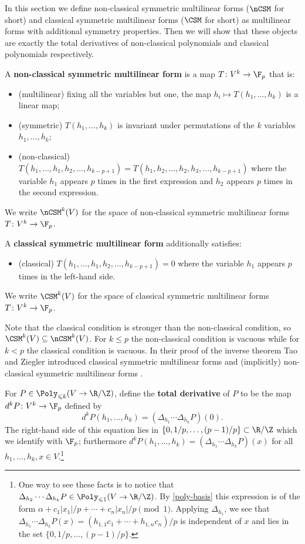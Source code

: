 In this section we define non-classical symmetric multilinear forms ($\nCSM$ for short) and classical symmetric multilinear forms ($\CSM$ for short) as multilinear forms with additional symmetry properties. Then we will show that these objects are exactly the total derivatives of non-classical polynomials and classical polynomials respectively.

\begin{defn}
A \textbf{non-classical symmetric multilinear form} is a map $T\colon V^k\to\F_p$ that is:
\begin{itemize}
    \item (multilinear) fixing all the variables but one, the map $h_i\mapsto T(h_1,\ldots,h_k)$ is a linear map;
    \item (symmetric) $T(h_1,\ldots,h_k)$ is invariant under permutations of the $k$ variables $h_1,\ldots, h_k$;
    \item (non-classical) $T(h_1,\ldots, h_1,h_2,\ldots, h_{k-p+1})=T(h_1,h_2,\ldots,h_2,h_3,\ldots, h_{k-p+1})$ where the variable $h_1$ appears $p$ times in the first expression and $h_2$ appears $p$ times in the second expression.
\end{itemize}
We write $\nCSM^k(V)$ for the space of non-classical symmetric multilinear forms $T\colon V^k\to \F_p$.

A \textbf{classical symmetric multilinear form} additionally satisfies:
\begin{itemize}
    \item (classical) $T(h_1,\ldots, h_1,h_2,\ldots, h_{k-p+1})=0$ where the variable $h_1$ appears $p$ times in the left-hand side.
\end{itemize}
We write $\CSM^k(V)$ for the space of classical symmetric multilinear forms $T\colon V^k\to \F_p$.
\end{defn}

Note that the classical condition is stronger than the non-classical condition, so $\CSM^k(V)\subseteq\nCSM^k(V)$. For $k\leq p$ the non-classical condition is vacuous while for $k<p$ the classical condition is vacuous. In their proof of the inverse theorem Tao and Ziegler introduced classical symmetric multilinear forms and (implicitly) non-classical symmetric multilinear forms \cite{TZ12}.

\begin{defn}
For $P\in\Poly_{\leqslant k}(V\to\R/\Z)$, define the \textbf{total derivative} of $P$ to be the map $d^kP\colon V^k\to\F_p$ defined by \[d^kP(h_1,\ldots, h_k)=(\Delta_{h_1}\cdots \Delta_{h_k}P)(0).\] The right-hand side of this equation lies in $\{0,1/p,\ldots,(p-1)/p\}\subset\R/\Z$ which we identify with $\F_p$; furthermore $d^kP(h_1,\ldots, h_k)=(\Delta_{h_1}\cdots \Delta_{h_k}P)(x)$ for all $h_1,\ldots, h_k,x\in V$.\footnote{One way to see these facts is to notice that $\Delta_{h_2}\cdots\Delta_{h_k}P\in\Poly_{\leqslant 1}(V\to\R/\Z)$. By \cref{poly-basis} this expression is of the form $\alpha+c_1|x_1|/p+\cdots+c_n|x_n|/p \pmod1$. Applying $\Delta_{h_1}$, we see that $\Delta_{h_1}\cdots \Delta_{h_k}P(x)=(h_{1,1}c_1+\cdots+h_{1,n}c_n)/p$ is independent of $x$ and lies in the set $\{0,1/p,\ldots,(p-1)/p\}$.}
\end{defn}

